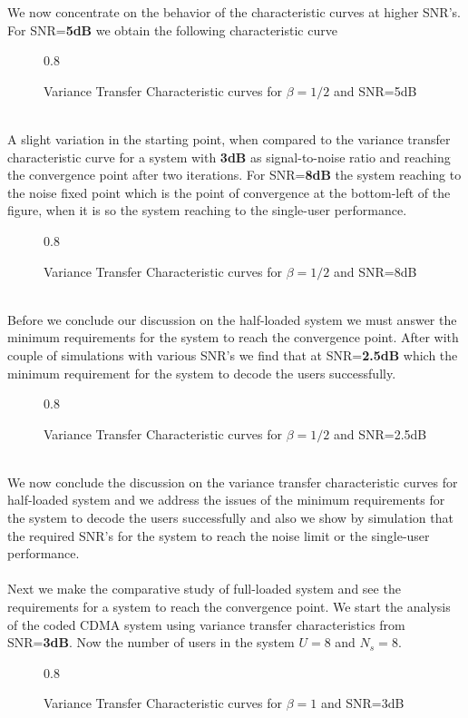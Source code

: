 We now concentrate on the behavior of the characteristic curves at higher SNR's. For SNR=\textbf{5dB} we obtain the following characteristic curve
\begin{figure}[htb]
\centerline{  {0.8} }
\caption{Variance Transfer Characteristic curves for $\beta=1/2$ and SNR=5dB}
\end{figure}\\
A slight variation in the starting point, when compared to the variance transfer characteristic curve for a system with \textbf{3dB} as signal-to-noise ratio and reaching the convergence point after two iterations. 
\newpage
For SNR=\textbf{8dB} the system reaching to the noise fixed point \cite{VTC} which is the point of convergence at the bottom-left of the figure, when it is so the system reaching to the single-user performance.
\begin{figure}[htb]
\centerline{  {0.8} }
\caption{Variance Transfer Characteristic curves for $\beta=1/2$ and SNR=8dB}
\end{figure}\\
Before we conclude our discussion on the half-loaded system we must answer the minimum requirements for the system to reach the convergence point. After with couple of simulations with various SNR's we find that at SNR=\textbf{2.5dB} which the minimum requirement for the system to decode the users successfully.
\begin{figure}[htb]
\centerline{  {0.8} }
\caption{Variance Transfer Characteristic curves for $\beta=1/2$ and SNR=2.5dB}
\end{figure}\\
We now conclude the discussion on the variance transfer characteristic curves for half-loaded system and we address the issues of the minimum requirements for the system to decode the users successfully and also we show by simulation that the required SNR's for the system to reach the noise limit or the single-user performance. \\ \\
Next we make the comparative study of full-loaded system and see the requirements for a system to reach the convergence point.
\newpage
We start the analysis of the coded CDMA system using variance transfer characteristics from SNR=\textbf{3dB}. Now the number of users in the system $U=8$ and $N_s=8$.
\begin{figure}[htb]
\centerline{  {0.8} }
\caption{Variance Transfer Characteristic curves for $\beta=1$ and SNR=3dB}
\end{figure}\\
